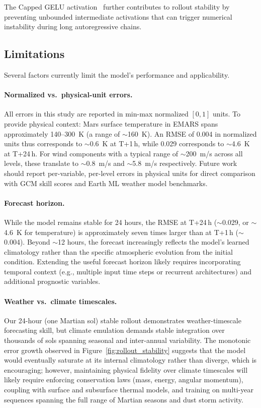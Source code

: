 \documentclass[11pt, a4paper, twocolumn]{article}
\begin{document}
The Capped GELU activation~\cite{hendrycks2016} further contributes to rollout stability by preventing unbounded intermediate activations that can trigger numerical instability during long autoregressive chains.

\subsection{Limitations}

Several factors currently limit the model's performance and applicability.

\paragraph{Normalized vs.\ physical-unit errors.} All errors in this study are reported in min-max normalized $[0, 1]$ units. To provide physical context: Mars surface temperature in EMARS spans approximately 140--300~K (a range of ${\sim}$160~K). An RMSE of 0.004 in normalized units thus corresponds to ${\sim}$0.6~K at T+1\,h, while 0.029 corresponds to ${\sim}$4.6~K at T+24\,h. For wind components with a typical range of ${\sim}$200~m/s across all levels, these translate to ${\sim}$0.8~m/s and ${\sim}$5.8~m/s respectively. Future work should report per-variable, per-level errors in physical units for direct comparison with GCM skill scores and Earth ML weather model benchmarks.

\paragraph{Forecast horizon.} While the model remains stable for 24 hours, the RMSE at T+24\,h (${\sim}$0.029, or ${\sim}$4.6~K for temperature) is approximately seven times larger than at T+1\,h (${\sim}$0.004). Beyond ${\sim}$12 hours, the forecast increasingly reflects the model's learned climatology rather than the specific atmospheric evolution from the initial condition. Extending the useful forecast horizon likely requires incorporating temporal context (e.g., multiple input time steps or recurrent architectures) and additional prognostic variables.

\paragraph{Weather vs.\ climate timescales.} Our 24-hour (one Martian sol) stable rollout demonstrates weather-timescale forecasting skill, but climate emulation demands stable integration over thousands of sols spanning seasonal and inter-annual variability. The monotonic error growth observed in Figure~\ref{fig:rollout_stability} suggests that the model would eventually saturate at its internal climatology rather than diverge, which is encouraging; however, maintaining physical fidelity over climate timescales will likely require enforcing conservation laws (mass, energy, angular momentum), coupling with surface and subsurface thermal models, and training on multi-year sequences spanning the full range of Martian seasons and dust storm activity.
\end{document}
